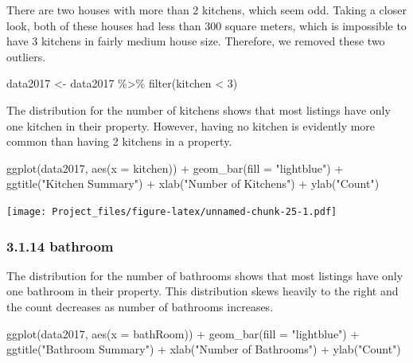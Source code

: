 \documentclass[
]{article}
\newenvironment{Shaded}{\begin{snugshade}}{\end{snugshade}}
\newcommand{\AttributeTok}[1]{\textcolor[rgb]{0.77,0.63,0.00}{#1}}
\newcommand{\DecValTok}[1]{\textcolor[rgb]{0.00,0.00,0.81}{#1}}
\newcommand{\FunctionTok}[1]{\textcolor[rgb]{0.00,0.00,0.00}{#1}}
\newcommand{\NormalTok}[1]{#1}
\newcommand{\OtherTok}[1]{\textcolor[rgb]{0.56,0.35,0.01}{#1}}
\newcommand{\SpecialCharTok}[1]{\textcolor[rgb]{0.00,0.00,0.00}{#1}}
\newcommand{\StringTok}[1]{\textcolor[rgb]{0.31,0.60,0.02}{#1}}
\begin{document}
There are two houses with more than 2 kitchens, which seem odd. Taking a
closer look, both of these houses had less than 300 square meters, which
is impossible to have 3 kitchens in fairly medium house size. Therefore,
we removed these two outliers.

\begin{Shaded}
\begin{Highlighting}[]
\NormalTok{data2017 }\OtherTok{\textless{}{-}}\NormalTok{ data2017 }\SpecialCharTok{\%\textgreater{}\%}
  \FunctionTok{filter}\NormalTok{(kitchen }\SpecialCharTok{\textless{}} \DecValTok{3}\NormalTok{)}
\end{Highlighting}
\end{Shaded}

The distribution for the number of kitchens shows that most listings
have only one kitchen in their property. However, having no kitchen is
evidently more common than having 2 kitchens in a property.

\begin{Shaded}
\begin{Highlighting}[]
\FunctionTok{ggplot}\NormalTok{(data2017, }\FunctionTok{aes}\NormalTok{(}\AttributeTok{x =}\NormalTok{ kitchen)) }\SpecialCharTok{+}
  \FunctionTok{geom\_bar}\NormalTok{(}\AttributeTok{fill =} \StringTok{"lightblue"}\NormalTok{) }\SpecialCharTok{+}
  \FunctionTok{ggtitle}\NormalTok{(}\StringTok{"Kitchen Summary"}\NormalTok{) }\SpecialCharTok{+}
  \FunctionTok{xlab}\NormalTok{(}\StringTok{"Number of Kitchens"}\NormalTok{) }\SpecialCharTok{+}
  \FunctionTok{ylab}\NormalTok{(}\StringTok{"Count"}\NormalTok{)}
\end{Highlighting}
\end{Shaded}

\texttt{[image: Project\_files/figure-latex/unnamed-chunk-25-1.pdf]}

\hypertarget{bathroom}{%
\subsubsection{3.1.14 bathroom}\label{bathroom}}

The distribution for the number of bathrooms shows that most listings
have only one bathroom in their property. This distribution skews
heavily to the right and the count decreases as number of bathrooms
increases.

\begin{Shaded}
\begin{Highlighting}[]
\FunctionTok{ggplot}\NormalTok{(data2017, }\FunctionTok{aes}\NormalTok{(}\AttributeTok{x =}\NormalTok{ bathRoom)) }\SpecialCharTok{+}
  \FunctionTok{geom\_bar}\NormalTok{(}\AttributeTok{fill =} \StringTok{"lightblue"}\NormalTok{) }\SpecialCharTok{+}
  \FunctionTok{ggtitle}\NormalTok{(}\StringTok{"Bathroom Summary"}\NormalTok{) }\SpecialCharTok{+}
  \FunctionTok{xlab}\NormalTok{(}\StringTok{"Number of Bathrooms"}\NormalTok{) }\SpecialCharTok{+}
  \FunctionTok{ylab}\NormalTok{(}\StringTok{"Count"}\NormalTok{)}
\end{Highlighting}
\end{Shaded}
\end{document}
